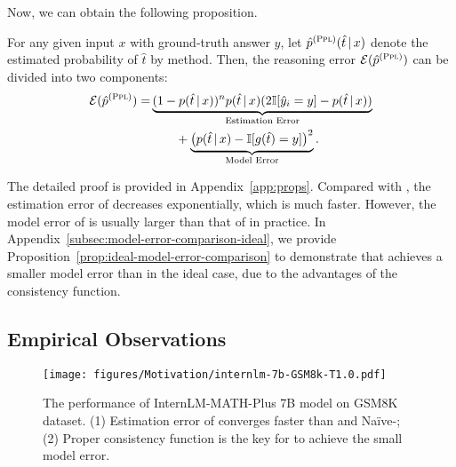 Now, we can obtain the following proposition.
\begin{proposition}
\label{prop:ppl-reasoning-error-decomposition}
For any given input $x$ with ground-truth answer $y$, let $\hat{p}^{(\textsc{Ppl})}(\hat{t} \,|\, x)$ denote the estimated probability of $\hat{t}$ by \PP method.
Then, the reasoning error $\mathcal{E}(\hat{p}^{(\textsc{Ppl})})$ can be divided into two components: 
\begin{equation*}
    \begin{aligned}
        \mathcal{E}(\hat{p}^{(\textsc{Ppl})}) = 
        & \underbrace{(1 - p(\hat{t} \,|\, x)) ^ n {p}(\hat{t} \,|\, x) ( 2 \mathbb{I}[\hat{y}_i = y] - p(\hat{t} \,|\, x) ) }_{\text{Estimation Error}} \\
        & \qquad + \underbrace{\big ( p(\hat{t} \,|\, x) - \mathbb{I}[g(\hat{t}) = y] \big )^2}_{\text{Model Error}}. \\
    \end{aligned}
\end{equation*}
\end{proposition}

\begin{remark}
The detailed proof is provided in Appendix~\ref{app:props}.
Compared with \SC, the estimation error of \PP decreases exponentially, which is much faster. However, the model error of \PP is usually larger than that of \SC in practice. In Appendix~\ref{subsec:model-error-comparison-ideal}, we provide Proposition~\ref{prop:ideal-model-error-comparison} to demonstrate that \SC achieves a smaller model error than \PP in the ideal case, due to the advantages of the consistency function.
\end{remark}

\subsection{Empirical Observations}

\begin{figure}[t]
    \begin{center}
    \texttt{[image: figures/Motivation/internlm-7b-GSM8k-T1.0.pdf]}
    \caption{The performance of InternLM-MATH-Plus 7B model on GSM8K dataset. (1) Estimation error of \PP converges faster than \SC and Na\"{i}ve-\SC; (2) Proper consistency function is the key for \SC to achieve the small model error.}
    \label{fig:motivation-estimation-error}
    \end{center}
    \vskip -0.2in
\end{figure}

